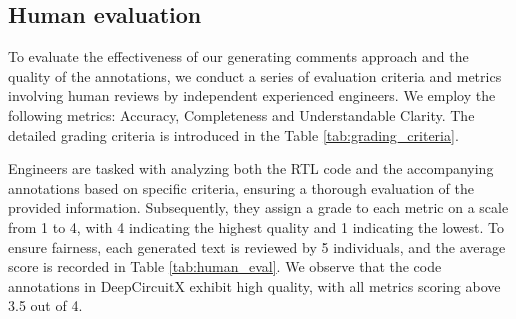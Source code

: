 \subsection{Human evaluation}
\label{sec:humaneval}
To evaluate the effectiveness of our generating comments approach and the quality of the annotations, we conduct a series of evaluation criteria and metrics involving human reviews by independent experienced engineers. 
We employ the following metrics: Accuracy, Completeness and Understandable Clarity. The detailed grading criteria is introduced in the Table \ref{tab:grading_criteria}.

\begin{table}[htbp]
\centering
    \caption{Grading Criteria for Annotation Quality.}
\label{tab:grading_criteria}
\end{table}





Engineers are tasked with analyzing both the RTL code and the accompanying annotations based on specific criteria, ensuring a thorough evaluation of the provided information. Subsequently, they assign a grade to each metric on a scale from 1 to 4, with 4 indicating the highest quality and 1 indicating the lowest. To ensure fairness, each generated text is reviewed by 5 individuals, and the average score is recorded in Table \ref{tab:human_eval}. We observe that the code annotations in DeepCircuitX exhibit high quality, with all metrics scoring above 3.5 out of 4.



